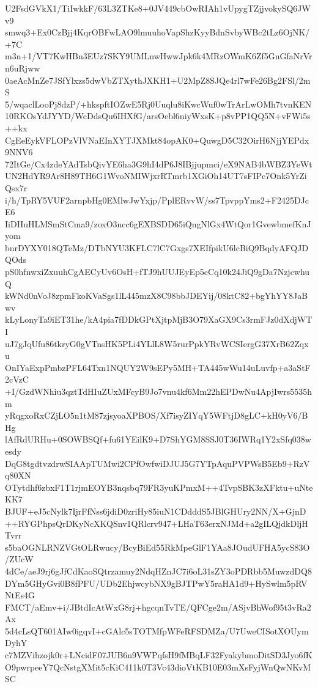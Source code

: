 U2FsdGVkX1/TiIwkkF/63L3ZTKe8+0JV449cbOwRIAh1vUpygTZjjvokySQ6JWv9
smwq3+Ex0CzBjj4KqrOBFwLAO9lmuuhoVapShzKyyBdnSvbyWBc2tLz6OjNK/+7C
m3n+1/VT7KwHBn3EUz7SKY9UMLnwHwwJpk6k4MRzOWmK6Zf5GnGfaNrVrn6uRjww
0aeAcMnZe7JSfYlxzs5dwVbZTXythJXKH1+U2MpZ8SJQe4rl7wFe26Bg2FSl/2mS
5/wqaclLooPj8dzP/+hkspftIOZwE5Rj0Uuqlu8iKwcWuf0wTrArLwOMh7tvnKEN
10RKOsYdJYYD/WcDdsQu6IHXfG/arsOebl6niyWxsK+p8vPP1QQ5N+vFWi5s++kx
CgEeEykVFLOPzVlVNaEInXYTJXMkt84opAK0+QuwgD5C32OirH6NjjYEPdx9NNV6
72ItGe/Cx4zdeYAdTsbQivYE6ha3G9hI4dP6J8IBjjupmci/eX9NAB4bWBZ3YeWt
UN2HdYR9Ar8H89TH6G1WvoNMIWjxrRTmrb1XGiOh14UT7sFIPc7Onk5YrZiQsx7r
i/h/TpRY5VUF2arnpbHg0EMlwJwYxjp/PplERvvW/ss7TpvppYms2+F2425DJcE6
IiDHuHLMSmStCma9/zoxO3ncc6gEXBSDD65iQngNlGx4WtQor1GvewbmefKnJyom
bnrDYXY018QTeMz/DTbNYU3KFLC7lC7Gxgs7XEIfpikU6lcBiQ9BqdyAFQJDQOds
pS0hfnwxiZxuuhCgAECyUv6OsH+fTJ9hUUJEyEp5cCq10k24JiQ9gDa7NzjcwhuQ
kWNd0nVoJ8zpmFkoKVaSgs1lL445mzX8C98bbJDEYij/08ktC82+bgYhYY8JaBwv
kLyLonyTa9iET31he/kA4pia7fDDkGPtXjtpMjB3O79XaGX9Cs3rmFJz0dXdjWTI
uJ7gJqUfu86tkryG0gVTnsHK5PLi4YLlL8W5rurPpkYRvWCSIergG37XrB62Zqxu
OnIYaExpPmbzPFL64Txn1NQUY2W9sEPy5MH+TA445wWu14uLuvfp+a3aStF2cVzC
+I/GzdWNhiu3qztTdHIuZUxMFcyB9Jo7vnu4kf6Mm22hEPDwNu4ApjIwrs5535hm
yRqgxoRxCZjLO5n1tM87zjsyoaXPBOS/Xf7isyZIYqY5WFtjD8gLC+kH0yV6/BHg
lAfRdURHu+0SOWBSQf+fu61YEilK9+D7ShYGM8SSJ0T36IWRq1Y2xSfq038wesdy
DqG8tgdtvzdrwSIAApTUMwi2CPfOwfwiDJUJ5G7YTpAquPVPWsB5Eb9+RzVq80XN
OTytdhf6zbxF1T1rjmEOYB3nqsbq79FR3yuKPmxM++4TvpSBK3zXFktu+uNteKK7
BJUF+eJ5cNylk7IjrFfNss6jdiD0zriHy85iuN1CDdddS5JBlGHUry2NN/X+GjnD
++RYGPhpsQrDKyNcXKQSnv1QRlcrv947+LHaT63erxNJMd+a2gILQjdkDljHTvrr
s5baOGNLRNZVGtOLRwucy/BcyBiEd55RkMpeGlF1YAa8JOudUFHA5ycS83O/ZUcW
4dCe/aeJ9rj6gJfCdKaoSQtrzamuy2NdqHZnJC7i6oL31sZY3oPDRbb5MuwzdDQ8
DYm5GHyGvi0B8fPFU/UDb2EhjwcybNX9gBJTPwY5raHA1d9+HySwlm5pRVNtEs4G
FMCT/aEmv+i/JBtdIcAtWxG8rj+hgcqnTvTE/QFCge2m/ASjvBhWof95t3vRa2Ax
5d4cLsQT601AIw0igqvI+cGAlc5sTOTMfpWFeRFSDMZa/U7UweCISotXOUymDyhY
c7MZVihzojk0r+LNcidF07JUB6n9VWPqfsH9fMBqLF32FyakybmoDitSD3Jyo6fK
O9pwrpeeY7QcNstgXMit5cKiC411k0T3Vc43dioVtKB10E03mXsFyjWnQwNKvMSC
